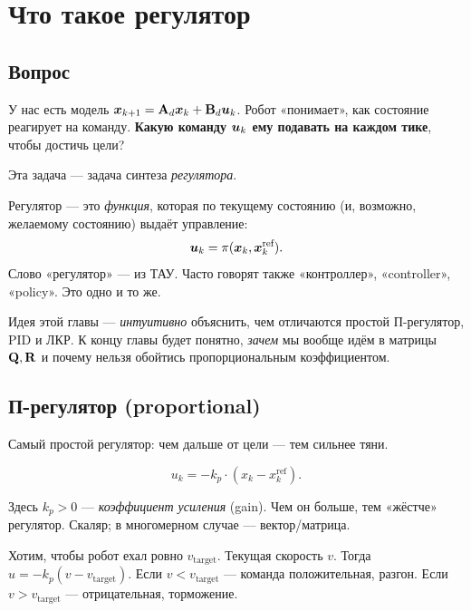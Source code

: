 \chapter{Что такое регулятор}
\label{ch:controllers}

\section{Вопрос}

У нас есть модель $\bm{x}_{k+1} = \mathbf{A}_d\bm{x}_k + \mathbf{B}_d\bm{u}_k$.
Робот «понимает», как состояние реагирует на команду. \textbf{Какую
команду $\bm{u}_k$ ему подавать на каждом тике}, чтобы достичь цели?

Эта задача --- задача синтеза \emph{регулятора}.

\begin{ideabox}
Регулятор --- это \emph{функция}, которая по текущему состоянию (и,
возможно, желаемому состоянию) выдаёт управление:
\[
  \bm{u}_k = \pi(\bm{x}_k, \bm{x}^\text{ref}_k).
\]
Слово «регулятор» --- из ТАУ. Часто говорят также «контроллер»,
«controller», «policy». Это одно и то же.
\end{ideabox}

Идея этой главы --- \emph{интуитивно} объяснить, чем отличаются простой
П-регулятор, PID и ЛКР. К концу главы будет понятно, \emph{зачем} мы вообще
идём в матрицы $\mathbf{Q}, \mathbf{R}$ и почему нельзя обойтись пропорциональным
коэффициентом.

\section{П-регулятор (proportional)}

Самый простой регулятор: чем дальше от цели --- тем сильнее тяни.

\begin{equation}
  u_k = -k_p \cdot (x_k - x^\text{ref}_k).
  \label{eq:P_controller}
\end{equation}

Здесь $k_p > 0$ --- \emph{коэффициент усиления} (gain). Чем он больше,
тем «жёстче» регулятор. Скаляр; в многомерном случае --- вектор/матрица.

\begin{examplebox}[title={Скаляр, удержание скорости}]
Хотим, чтобы робот ехал ровно $v_\text{target}$. Текущая скорость $v$.
Тогда $u = -k_p (v - v_\text{target})$. Если $v < v_\text{target}$ ---
команда положительная, разгон. Если $v > v_\text{target}$ --- отрицательная,
торможение.
\end{examplebox}

